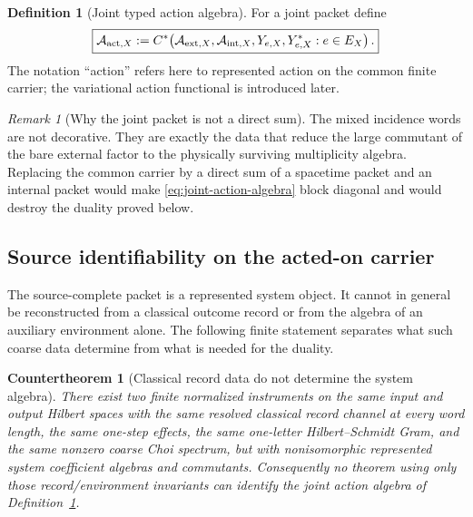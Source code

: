 \documentclass[11pt]{article}
\newtheorem{countertheorem}[theorem]{Countertheorem}
\theoremstyle{definition}
\newtheorem{definition}[theorem]{Definition}
\theoremstyle{remark}
\newtheorem{remark}[theorem]{Remark}
\newcommand{\A}{\mathcal A}
\begin{document}
\begin{definition}[Joint typed action algebra]
\label{def:action-algebra}
For a joint packet define
\begin{equation}
\boxed{
\A_{{\rm act},X}
:=
C^*\!\left(
\A_{{\rm ext},X},
\A_{{\rm int},X},
Y_{e,X},Y_{e,X}^*:e\in E_X
\right).}
\label{eq:joint-action-algebra}
\end{equation}
The notation ``action'' refers here to represented action on the common finite
carrier; the variational action functional is introduced later.
\end{definition}

\begin{remark}[Why the joint packet is not a direct sum]
The mixed incidence words are not decorative.  They are exactly the data that
reduce the large commutant of the bare external factor to the physically
surviving multiplicity algebra.  Replacing the common carrier by a direct sum
of a spacetime packet and an internal packet would make
\eqref{eq:joint-action-algebra} block diagonal and would destroy the duality
proved below.
\end{remark}

\subsection{Source identifiability on the acted-on carrier}
\label{sec:source-identifiability}

The source-complete packet is a represented system object.  It cannot in
general be reconstructed from a classical outcome record or from the algebra
of an auxiliary environment alone.  The following finite statement separates
what such coarse data determine from what is needed for the duality.

\begin{countertheorem}[Classical record data do not determine the system algebra]
\label{thm:record-nonidentifiability}
There exist two finite normalized instruments on the same input and output
Hilbert spaces with the same resolved classical record channel at every word
length, the same one-step effects, the same one-letter Hilbert--Schmidt Gram,
and the same nonzero coarse Choi spectrum, but with nonisomorphic represented
system coefficient algebras and commutants.  Consequently no theorem using
only those record/environment invariants can identify the joint action algebra
of Definition~\ref{def:action-algebra}.
\end{countertheorem}
\end{document}
